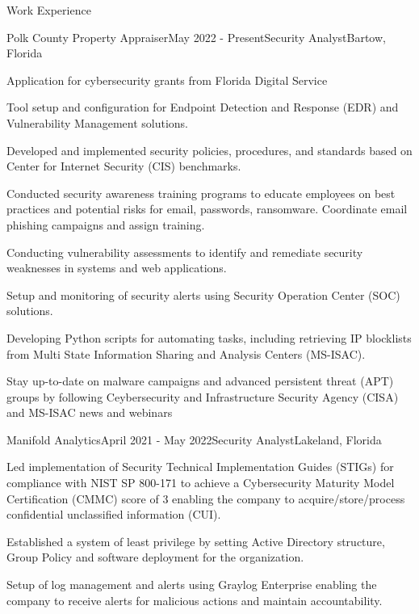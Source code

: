 \documentclass{resume} %
\begin{document}

\begin{rSection}{Work Experience}

	\begin{rSubsection}{Polk County Property Appraiser}{May 2022 - Present}{Security Analyst}{Bartow, Florida}
		\item Application for cybersecurity grants from Florida Digital Service
		\item Tool setup and configuration for Endpoint Detection and Response (EDR) and Vulnerability Management solutions.
		\item Developed and implemented security policies, procedures, and standards based on Center for Internet Security (CIS) benchmarks.
		\item Conducted security awareness training programs to educate employees on best practices and potential risks for email, passwords, ransomware. Coordinate email phishing campaigns and assign training. 
		\item Conducting vulnerability assessments to identify and remediate security weaknesses in systems and web applications. %
		\item Setup and monitoring of security alerts using Security Operation Center (SOC) solutions.
		\item Developing Python scripts for automating tasks, including retrieving IP blocklists from Multi State Information Sharing and Analysis Centers (MS-ISAC).
		\item Stay up-to-date on malware campaigns and advanced persistent threat (APT) groups by following Ceybersecurity and Infrastructure Security Agency (CISA) and MS-ISAC news and webinars
	\end{rSubsection}
	\begin{rSubsection}{Manifold Analytics}{April 2021 - May 2022}{Security Analyst}{Lakeland, Florida}
		\item Led implementation of Security Technical Implementation Guides (STIGs) for compliance with NIST SP 800-171 to achieve a Cybersecurity Maturity Model Certification (CMMC) score of 3 enabling the company to acquire/store/process confidential unclassified information (CUI).
		\item Established a system of least privilege by setting Active Directory structure, Group Policy and software deployment for the organization.
		\item Setup of log management and alerts using Graylog Enterprise enabling the company to receive alerts for malicious actions and maintain accountability.
	\end{rSubsection}


\end{rSection}
\end{document}
